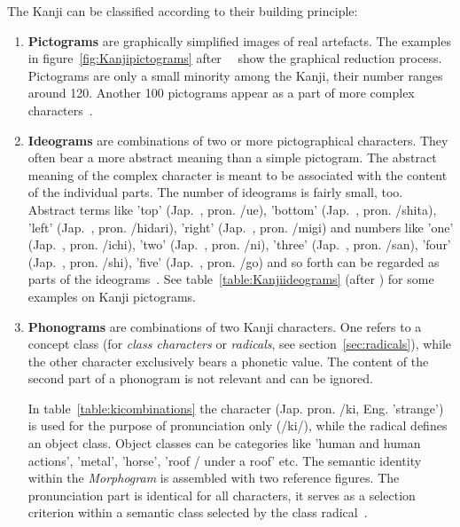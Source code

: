 The Kanji can be classified according to their building principle:
\begin{enumerate}
 \item \textbf{Pictograms} are graphically simplified images of real artefacts.
       The examples in figure~\ref{fig:Kanjipictograms} 
       after~~\citeyear{Kano1990} show the graphical 
       reduction process. Pictograms are only a small minority among the Kanji,
       their number ranges around 120. Another 100 pictograms appear as a part of
       more complex characters~.
       
 \item \textbf{Ideograms} are combinations of two or more pictographical
       characters. They often bear a more abstract meaning than a simple 
       pictogram. The abstract meaning of the complex character is meant to be 
       associated with the content of the individual parts. The number of 
       ideograms is fairly small, too. Abstract terms like 
       'top' (Jap.~, pron. /ue), 
       'bottom' (Jap.~, pron. /shita),
       'left' (Jap.~, pron. /hidari),
       'right' (Jap.~, pron. /migi)
       and numbers like
       'one' (Jap.~, pron. /ichi),
       'two' (Jap.~, pron. /ni),
       'three' (Jap.~, pron. /san),
       'four' (Jap.~, pron. /shi),
       'five' (Jap.~, pron. /go)
       and so forth can be regarded as parts of the 
       ideograms~.
       See table~\ref{table:Kanjiideograms} (after ) for 
       some examples on Kanji pictograms.

 \item \textbf{Phonograms} are combinations of two Kanji characters. One
       refers to a concept class (for \emph{class characters} or \emph{radicals},
       see section~\ref{sec:radicals}), 
       while the other character exclusively bears a phonetic value. The content
       of the second part of a phonogram is not relevant and can be ignored.

       In table~\ref{table:kicombinations} the character 
        (Jap. pron. /ki, Eng. 'strange') is used for the purpose
       of pronunciation only (/ki/), while the radical defines an
       object class. Object classes can be categories like 'human and human 
       actions', 'metal', 'horse', 'roof / under a roof' etc.
       The semantic identity within the \emph{Morphogram} is assembled with two
       reference figures. The pronunciation part is identical for all characters,
       it serves as a selection criterion within a semantic class selected by 
       the class radical~.

\end{enumerate}

